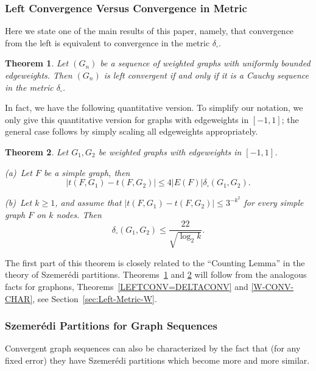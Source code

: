 \documentclass[12pt]{article}
\newtheorem{theorem}{Theorem}[section]
\numberwithin{equation}{section}
\begin{document}
\subsubsection{Left Convergence Versus Convergence in Metric}

Here we state one of the main results of this paper, namely, that
convergence from the left is equivalent to convergence in the metric
$\delta_\square$.

\begin{theorem}
\label{thm:left-equiv-metric} Let $(G_n)$ be a sequence of weighted
graphs with uniformly bounded edgeweights. Then $(G_n)$ is left
convergent if and only if it is a Cauchy sequence in the metric
$\delta_\square$.
\end{theorem}

In fact, we have the following quantitative version. To simplify our
notation, we only give this quantitative version for graphs with
edgeweights in $[-1,1]$; the general case follows by simply scaling
all edgeweights appropriately.

\begin{theorem}\label{F-CONV-CHAR}
Let $G_1,G_2$ be weighted graphs
with edgeweights in $[-1,1]$.

\smallskip

{\rm (a)}~Let $F$ be a simple graph, then
\[
|t(F,G_1)-t(F,G_2)|\le 4|E(F)|\delta_\square(G_1,G_2).
\]

\smallskip

{\rm (b)}~Let $k\geq 1$, and assume that
$
|t(F,G_1)-t(F,G_2)|\leq 3^{-{k^2}}
$
for every simple graph $F$ on $k$ nodes. Then
\[
\delta_\square(G_1,G_2) \le \frac{22}{\sqrt{\log_2 k}}.
\]
\end{theorem}



The first part of this theorem is closely related to the ``Counting
Lemma'' in the theory of Szemer\'edi partitions.
Theorems~\ref{thm:left-equiv-metric} and \ref{F-CONV-CHAR} will
follow from the analogous facts for graphons,
Theorems~\ref{LEFTCONV=DELTACONV} and \ref{W-CONV-CHAR}, see
Section~\ref{sec:Left-Metric-W}.

\subsubsection{Szemer\'edi Partitions for Graph Sequences}


Convergent graph sequences can also be characterized by the fact
that (for any
fixed error) they have Szemer\'edi partitions
which become more and more similar.
\end{document}
